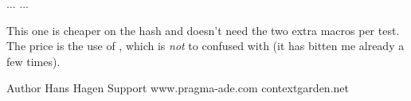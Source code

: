 \starttyping[option=TEX]
\ifconditional\MyConditional
    ...
\else
    ...
\fi
\stoptyping

This one is cheaper on the hash and doesn't need the two extra macros per test.
The price is the use of \type {\ifconditional}, which is {\em not} to confused
with \type {\ifcondition} (it has bitten me already a few times).

\stopsubsection

\stopsection

\startsubject[title=Colofon]

\starttabulate
\NC Author      \NC Hans Hagen         \NC \NR
\NC \CONTEXT    \NC \contextversion    \NC \NR
\NC \LUAMETATEX \NC \texengineversion  \NC \NR
\NC Support     \NC www.pragma-ade.com \NC \NR
\NC             \NC contextgarden.net  \NC \NR
\stoptabulate

\stopsubject

\stopdocument
